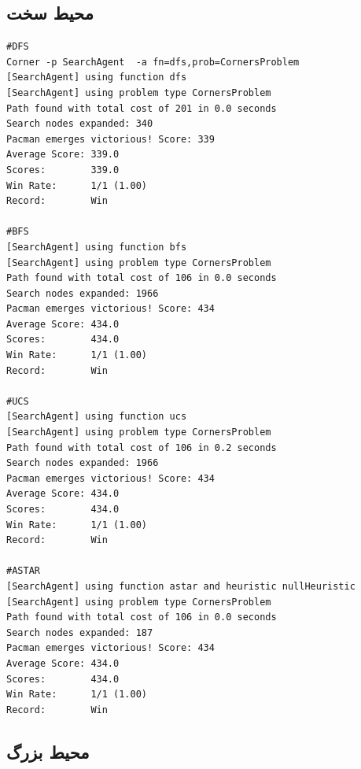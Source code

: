 \documentclass[11pt, a4paper, oneside]{book}
\begin{document}
\subsection{محیط سخت}
\begin{LTR}
	\begin{verbatim}
#DFS
Corner -p SearchAgent  -a fn=dfs,prob=CornersProblem
[SearchAgent] using function dfs
[SearchAgent] using problem type CornersProblem
Path found with total cost of 201 in 0.0 seconds
Search nodes expanded: 340
Pacman emerges victorious! Score: 339
Average Score: 339.0
Scores:        339.0
Win Rate:      1/1 (1.00)
Record:        Win

#BFS
[SearchAgent] using function bfs
[SearchAgent] using problem type CornersProblem
Path found with total cost of 106 in 0.0 seconds
Search nodes expanded: 1966
Pacman emerges victorious! Score: 434
Average Score: 434.0
Scores:        434.0
Win Rate:      1/1 (1.00)
Record:        Win

#UCS
[SearchAgent] using function ucs
[SearchAgent] using problem type CornersProblem
Path found with total cost of 106 in 0.2 seconds
Search nodes expanded: 1966
Pacman emerges victorious! Score: 434
Average Score: 434.0
Scores:        434.0
Win Rate:      1/1 (1.00)
Record:        Win

#ASTAR
[SearchAgent] using function astar and heuristic nullHeuristic
[SearchAgent] using problem type CornersProblem
Path found with total cost of 106 in 0.0 seconds
Search nodes expanded: 187
Pacman emerges victorious! Score: 434
Average Score: 434.0
Scores:        434.0
Win Rate:      1/1 (1.00)
Record:        Win

	\end{verbatim}
\end{LTR}


\subsection{محیط بزرگ}
\end{document}

